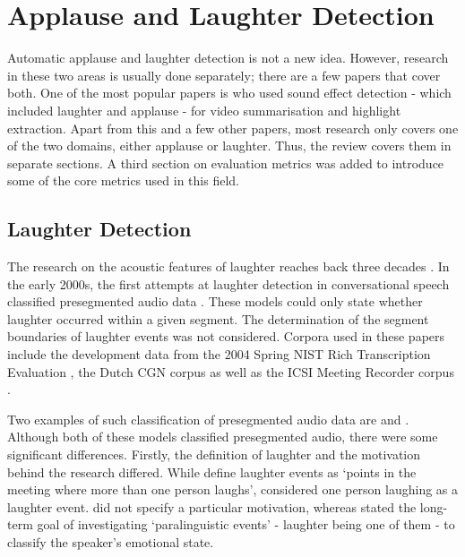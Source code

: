 \documentclass[bsc,frontabs,parskip,deptreport]{infthesis}
\begin{document}
\chapter{Applause and Laughter Detection} \label{cha:bg}
Automatic applause and laughter detection is not a new idea. However, research in these two areas is usually done separately; there are a few papers that cover both. One of the most popular papers is \citet{cai2003highlight} who used sound effect detection - which included laughter and applause - for video summarisation and highlight extraction.
Apart from this and a few other papers, most research only covers one of the two domains, either applause or laughter. Thus, the review covers them in separate sections. A third section on evaluation metrics was added to introduce some of the core metrics used in this field. 

\section{Laughter Detection} \label{sec:bg-laughter}
The research on the acoustic features of laughter reaches back three decades \citep{bickley1992acoustic}.
In the early 2000s, the first attempts at laughter detection in conversational speech classified presegmented audio data \citep{kennedy2004laughter, truong2005automatic}. These models could only state whether laughter occurred within a given segment. The determination of the segment boundaries of laughter events was not considered. 
Corpora used in these papers include the development data from the 2004 Spring NIST Rich Transcription Evaluation \citep{nist-recordings}, the Dutch CGN corpus \citep{oostdijk2000spoken} as well as the ICSI Meeting Recorder corpus \citep{morgan2001meeting}. 

Two examples of such classification of presegmented audio data are \citet{kennedy2004laughter} and \citet{truong2005automatic}. 
Although both of these models classified presegmented audio, there were some significant differences. 
Firstly, the definition of laughter and the motivation behind the research differed.
While \citet{kennedy2004laughter} define laughter events as `points in the meeting where more than one person laughs', \citet{truong2005automatic} considered one person laughing as a laughter event.
\citet{kennedy2004laughter} did not specify a particular motivation, whereas \citet{truong2005automatic} stated the long-term goal of investigating `paralinguistic events' - laughter being one of them - to classify the speaker's emotional state.   
\end{document}
